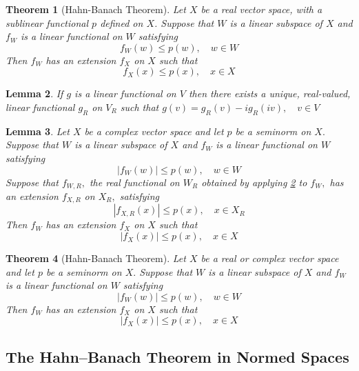 \documentclass[10pt]{paper}
\newtheorem{theorem}{Theorem}[section]
\newtheorem{lemma}[theorem]{Lemma}
\begin{document}
\begin{theorem}[Hahn-Banach Theorem]
    Let $X$ be a real vector space, with a sublinear functional $p$ defined on $X$. Suppose that $W$ is a linear subspace of $X$ and $f_{W}$ is a linear functional on $W$ satisfying
    $$
        f_{W}(w) \leq p(w), \quad w \in W
    $$
    Then $f_{W}$ has an extension $f_{X}$ on $X$ such that
    $$
        f_{X}(x) \leq p(x), \quad x \in X
    $$
\end{theorem}

\begin{lemma}\label{lf}
    If $g$ is a linear functional on $V$ then there exists a unique, real-valued, linear functional $g_{R}$ on $V_{R}$ such that $g(v)=g_{R}(v)-i g_{R}(i v), \quad v \in V$
\end{lemma}

\begin{lemma}
    Let $X$ be a complex vector space and let $p$ be a seminorm on $X .$ Suppose that $W$ is a linear subspace of $X$ and $f_{W}$ is a linear functional on $W$ satisfying
    $$
        \left|f_{W}(w)\right| \leq p(w), \quad w \in W
    $$
    Suppose that $f_{W, R},$ the real functional on $W_{R}$ obtained by applying \ref{lf} to $f_{W},$ has an extension $f_{X, R}$ on $X_{R},$ satisfying
    $$
        \left|f_{X, R}(x)\right| \leq p(x), \quad x \in X_{R}
    $$
    Then $f_{W}$ has an extension $f_{X}$ on $X$ such that
    $$
        \left|f_{X}(x)\right| \leq p(x), \quad x \in X
    $$
\end{lemma}

\begin{theorem}[Hahn-Banach Theorem]
    Let $X$ be a real or complex vector space and let $p$ be a seminorm on $X .$ Suppose that $W$ is a linear subspace of $X$ and $f_{W}$ is a linear functional on $W$ satisfying
    $$
        \left|f_{W}(w)\right| \leq p(w), \quad w \in W
    $$
    Then $f_{W}$ has an extension $f_{X}$ on $X$ such that
    $$
        \left|f_{X}(x)\right| \leq p(x), \quad x \in X
    $$
\end{theorem}


\subsection{The Hahn–Banach Theorem in Normed Spaces}
\end{document}
